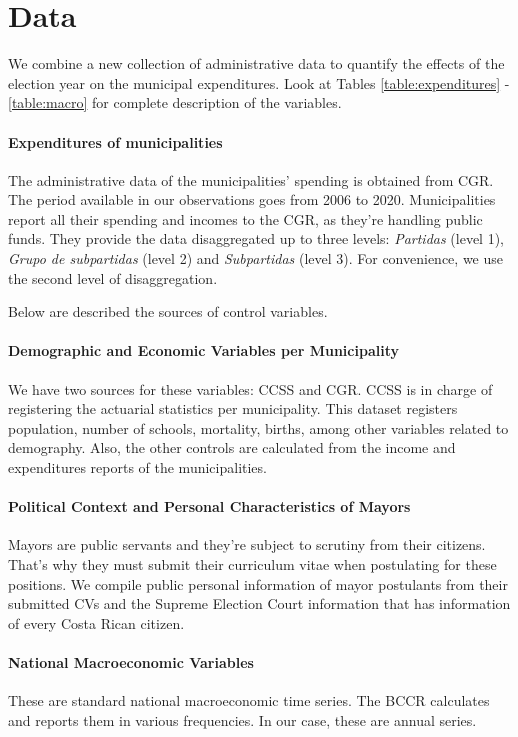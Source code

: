 \section{Data}

We combine a new collection of administrative data to quantify the effects of the election year on the municipal expenditures. Look at Tables \ref{table:expenditures} - \ref{table:macro} for complete description of the variables. 

\paragraph{Expenditures of municipalities} 

The administrative data of the municipalities' spending is obtained from CGR. The period available in our observations goes from 2006 to 2020. Municipalities report all their spending and incomes to the CGR, as they're handling public funds. They provide the data disaggregated up to three levels: \textit{Partidas} (level 1), \textit{Grupo de subpartidas} (level 2) and \textit{Subpartidas} (level 3). For convenience, we use the second level of disaggregation.

Below are described the sources of control variables. 
\paragraph{Demographic and Economic Variables per Municipality}

We have two sources for these variables: CCSS and CGR. CCSS is in charge of registering the actuarial statistics per municipality. This dataset registers population, number of schools, mortality, births, among other variables related to demography. Also, the other controls are calculated from the income and expenditures reports of the municipalities. 

\paragraph{Political Context and Personal Characteristics of Mayors}
Mayors are public servants and they're subject to scrutiny from their citizens. That's why they must submit their curriculum vitae when postulating for these positions. We compile public personal information of mayor postulants from their submitted CVs and the Supreme Election Court information that has information of every Costa Rican citizen. 

\paragraph{National Macroeconomic Variables}
These are standard national macroeconomic time series. The BCCR calculates and reports them in various frequencies. In our case, these are annual series. 
